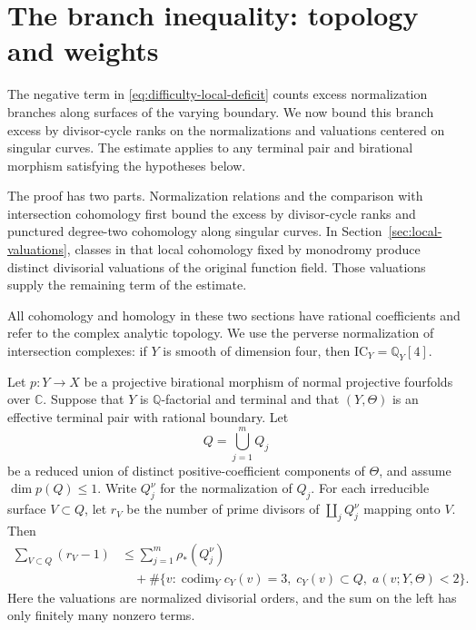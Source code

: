 \section{The branch inequality: topology and weights}
\label{sec:branch-topology}

The negative term in \eqref{eq:difficulty-local-deficit} counts excess
normalization branches along surfaces of the varying boundary.  We now
bound this branch excess by divisor-cycle ranks on the normalizations
and valuations centered on singular curves.  The estimate applies to
any terminal pair and birational morphism satisfying the hypotheses
below.

The proof has two parts.  Normalization relations and the comparison
with intersection cohomology first bound the excess by divisor-cycle
ranks and punctured degree-two cohomology along singular curves.  In
Section~\ref{sec:local-valuations}, classes in that local cohomology
fixed by monodromy produce distinct divisorial valuations of the original
function field.  Those valuations supply the remaining term of the
estimate.

All cohomology and homology in these two sections have rational
coefficients and refer to the complex analytic topology.  We use the
perverse normalization of intersection complexes: if $Y$ is smooth of
dimension four, then $\mathrm{IC}_Y=\mathbb Q_Y[4]$.

\begin{theorem}\label{thm:branch}
Let $p\colon Y\to X$ be a projective birational morphism of normal
projective fourfolds over $\mathbb C$.  Suppose that $Y$ is
$\mathbb Q$-factorial and terminal and that $(Y,\Theta)$ is an effective
terminal pair with rational boundary.  Let
\[
 Q=\bigcup_{j=1}^{m}Q_j
\]
be a reduced union of distinct positive-coefficient components of
$\Theta$, and assume $\dim p(Q)\leq 1$.
Write $Q_j^\nu$ for the normalization of $Q_j$.  For each irreducible
surface $V\subset Q$, let $r_V$ be the number of prime divisors of
$\coprod_jQ_j^\nu$ mapping onto $V$.  Then
\begin{equation}\label{eq:branch-inequality}
 \begin{aligned}
 \sum_{V\subset Q}(r_V-1)
 &\leq\sum_{j=1}^{m}\rho_*(Q_j^\nu)\\
 &\quad+\#\bigl\{v:\operatorname{codim}_Yc_Y(v)=3,\;
          c_Y(v)\subset Q,\;a(v;Y,\Theta)<2\bigr\}.
 \end{aligned}
\end{equation}
Here the valuations are normalized divisorial orders, and the sum on
the left has only finitely many nonzero terms.
\end{theorem}

